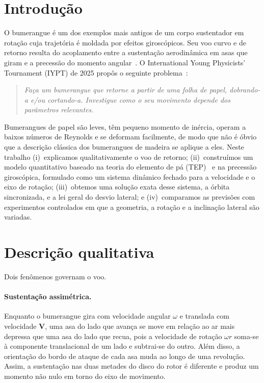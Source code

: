 \documentclass[aps,pre,twocolumn,superscriptaddress,nofootinbib,floatfix]{revtex4-2}
\newcommand{\vect}[1]{\bm{#1}}
\begin{document}
\section{Introdução}
\label{sec:intro}

O bumerangue é um dos exemplos mais antigos de um corpo sustentador em rotação cuja trajetória é moldada por efeitos giroscópicos. Seu voo curvo e de retorno resulta do acoplamento entre a sustentação aerodinâmica em asas que giram e a precessão do momento angular~\cite{hess1968,azuma2004}. O International Young Physicists' Tournament (IYPT) de 2025 propôs o seguinte problema~\cite{iypt2025}:
\begin{quote}
\emph{Faça um bumerangue que retorne a partir de uma folha de papel, dobrando-a e/ou cortando-a. Investigue como o seu movimento depende dos parâmetros relevantes.}
\end{quote}

Bumerangues de papel são leves, têm pequeno momento de inércia, operam a baixos números de Reynolds e se deformam facilmente, de modo que não é óbvio que a descrição clássica dos bumerangues de madeira se aplique a eles. Neste trabalho (i)~explicamos qualitativamente o voo de retorno; (ii)~construímos um modelo quantitativo baseado na teoria do elemento de pá (TEP)~\cite{leishman2006,gudem2019} e na precessão giroscópica, formulado como um sistema dinâmico fechado para a velocidade e o eixo de rotação; (iii)~obtemos uma solução exata desse sistema, a órbita sincronizada, e a lei geral do desvio lateral; e (iv)~comparamos as previsões com experimentos controlados em que a geometria, a rotação e a inclinação lateral são variadas.

\section{Descrição qualitativa}
\label{sec:qualitative}

Dois fenômenos governam o voo.

\paragraph*{Sustentação assimétrica.} Enquanto o bumerangue gira com velocidade angular $\omega$ e translada com velocidade $\vect V$, uma asa do lado que avança se move em relação ao ar mais depressa que uma asa do lado que recua, pois a velocidade de rotação $\omega r$ soma-se à componente translacional de um lado e subtrai-se do outro. Além disso, a orientação do bordo de ataque de cada asa muda ao longo de uma revolução. Assim, a sustentação nas duas metades do disco do rotor é diferente e produz um momento não nulo em torno do eixo de movimento.
\end{document}
